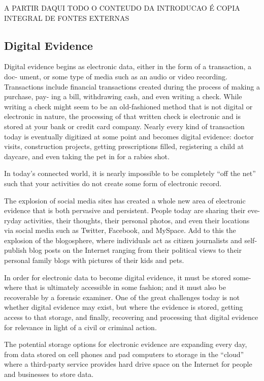 \begin{center}
A PARTIR DAQUI TODO O CONTEUDO DA INTRODUCAO É COPIA INTEGRAL DE FONTES EXTERNAS
\end{center}


\subsection{Digital Evidence}

Digital evidence begins as electronic data, either in the form of a transaction, a doc-
ument, or some type of media such as an audio or video recording. Transactions
include financial transactions created during the process of making a purchase, pay-
ing a bill, withdrawing cash, and even writing a check. While writing a check might
seem to be an old-fashioned method that is not digital or electronic in nature, the
processing of that written check is electronic and is stored at your bank or credit
card company. Nearly every kind of transaction today is eventually digitized at
some point and becomes digital evidence: doctor visits, construction projects,
getting prescriptions filled, registering a child at daycare, and even taking the pet in
for a rabies shot.

In today’s connected world, it is nearly impossible to be completely “off the
net” such that your activities do not create some form of electronic record.

The explosion of social media sites has created a whole new area of electronic
evidence that is both pervasive and persistent. People today are sharing their eve-
ryday activities, their thoughts, their personal photos, and even their locations via
social media such as Twitter, Facebook, and MySpace. Add to this the explosion
of the blogosphere, where individuals act as citizen journalists and self-publish
blog posts on the Internet ranging from their political views to their personal family
blogs with pictures of their kids and pets.

In order for electronic data to become digital evidence, it must be stored some-
where that is ultimately accessible in some fashion; and it must also be recoverable
by a forensic examiner. One of the great challenges today is not whether digital
evidence may exist, but where the evidence is stored, getting access to that storage,
and finally, recovering and processing that digital evidence for relevance in light of
a civil or criminal action.

The potential storage options for electronic evidence are expanding every
day, from data stored on cell phones and pad computers to storage in the “cloud”
where a third-party service provides hard drive space on the Internet for people and
businesses to store data.

